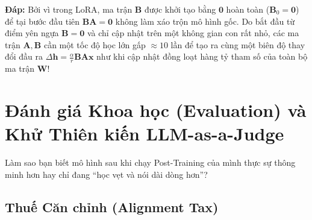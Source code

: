 \begin{debate}
\textbf{Đáp:} Bởi vì trong LoRA, ma trận $\mathbf{B}$ được khởi tạo bằng $\mathbf{0}$ hoàn toàn ($\mathbf{B}_0 = \mathbf{0}$) để tại bước đầu tiên $\mathbf{B}\mathbf{A} = \mathbf{0}$ không làm xáo trộn mô hình gốc. Do bắt đầu từ điểm yên ngựa $\mathbf{B} = \mathbf{0}$ và chỉ cập nhật trên một không gian con rất nhỏ, các ma trận $\mathbf{A}, \mathbf{B}$ cần một tốc độ học lớn gấp $\approx 10$ lần để tạo ra cùng một biên độ thay đổi đầu ra $\Delta \mathbf{h} = \frac{\alpha}{r}\mathbf{B}\mathbf{A}\mathbf{x}$ như khi cập nhật đồng loạt hàng tỷ tham số của toàn bộ ma trận $\mathbf{W}$!
\end{debate}

\section{Đánh giá Khoa học (Evaluation) và Khử Thiên kiến LLM-as-a-Judge}
\label{sec:evaluation}

Làm sao bạn biết mô hình sau khi chạy Post-Training của mình thực sự thông minh hơn hay chỉ đang ``học vẹt và nói dài dòng hơn''?

\subsection{Thuế Căn chỉnh (Alignment Tax) \citep{ouyang2022training, bai2022training}}

